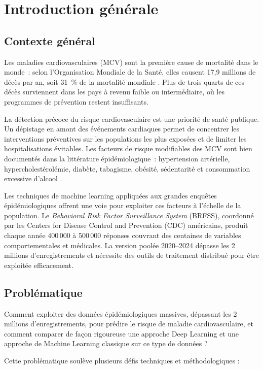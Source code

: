 \chapter{Introduction générale}

\section{Contexte général}

Les maladies cardiovasculaires (MCV) sont la première cause de mortalité dans le monde~:
selon l'Organisation Mondiale de la Santé, elles causent 17,9 millions de décès par an,
soit 31~\% de la mortalité mondiale \cite{who2023}.
Plus de trois quarts de ces décès surviennent dans les pays à revenu faible
ou intermédiaire, où les programmes de prévention restent insuffisants.

La détection précoce du risque cardiovasculaire est une priorité de santé publique.
Un dépistage en amont des événements cardiaques permet de concentrer les interventions
préventives sur les populations les plus exposées et de limiter les hospitalisations
évitables. Les facteurs de risque modifiables des MCV sont bien documentés dans la
littérature épidémiologique~: hypertension artérielle, hypercholestérolémie, diabète,
tabagisme, obésité, sédentarité et consommation excessive d'alcool \cite{roth2020}.

Les techniques de machine learning appliquées aux grandes enquêtes épidémiologiques
offrent une voie pour exploiter ces facteurs à l'échelle de la population.
Le \textit{Behavioral Risk Factor Surveillance System} (BRFSS), coordonné par les
Centers for Disease Control and Prevention (CDC) américains, produit chaque année
400\,000 à 500\,000 réponses couvrant des centaines de variables comportementales
et médicales. La version poolée 2020--2024 dépasse les 2 millions d'enregistrements
et nécessite des outils de traitement distribué pour être exploitée efficacement.

\section{Problématique}

Comment exploiter des données épidémiologiques massives, dépassant les 2 millions d'enregistrements, pour prédire le risque de maladie cardiovasculaire, et comment comparer de façon rigoureuse une approche Deep Learning et une approche de Machine Learning classique sur ce type de données ?

Cette problématique soulève plusieurs défis techniques et méthodologiques :

